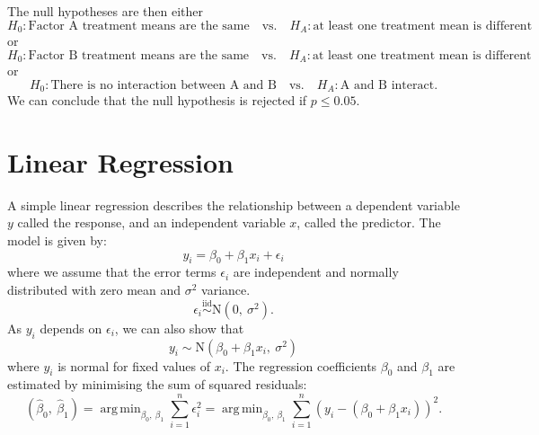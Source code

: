 \documentclass{article}
\DeclareMathOperator*{\argmin}{arg\,min}
\begin{document}
The null hypotheses are then either
\begin{equation*}
    H_0 : \text{Factor A treatment means are the same} \quad \text{vs.} \quad H_A : \text{at least one treatment mean is different}
\end{equation*}
or
\begin{equation*}
    H_0 : \text{Factor B treatment means are the same} \quad \text{vs.} \quad H_A : \text{at least one treatment mean is different}
\end{equation*}
or
\begin{equation*}
    H_0 : \text{There is no interaction between A and B} \quad \text{vs.} \quad H_A : \text{A and B interact}.
\end{equation*}
We can conclude that the null hypothesis is rejected if \(p \leq 0.05\).
\section{Linear Regression}
A simple linear regression describes the relationship between a dependent variable \(y\)
called the response,
and an independent variable \(x\), called the predictor. The model is given by:
\begin{equation*}
    y_i = \beta_0 + \beta_1 x_i + \epsilon_i
\end{equation*}
where we assume that the error terms \(\epsilon_i\) are independent and normally distributed with zero mean and \(\sigma^2\) variance.
\begin{equation*}
    \epsilon_i \overset{\mathrm{iid}}{\sim} \mathrm{N}\left( 0,\: \sigma^2 \right).
\end{equation*}
As \(y_i\) depends on \(\epsilon_i\), we can also show that
\begin{equation*}
    y_i \sim \mathrm{N}\left( \beta_0 + \beta_1 x_i,\: \sigma^2 \right)
\end{equation*}
where \(y_i\) is normal for fixed values of \(x_i\).
The regression coefficients \(\beta_0\) and \(\beta_1\) are estimated by minimising the sum of squared residuals:
\begin{equation*}
    \left( \hat{\beta}_0,\: \hat{\beta}_1 \right) = \argmin_{\beta_0,\: \beta_1} \sum_{i = 1}^n \epsilon_i^2 = \argmin_{\beta_0,\: \beta_1} \sum_{i = 1}^n \left( y_i - \left( \beta_0 + \beta_1 x_i \right) \right)^2.
\end{equation*}
\end{document}
